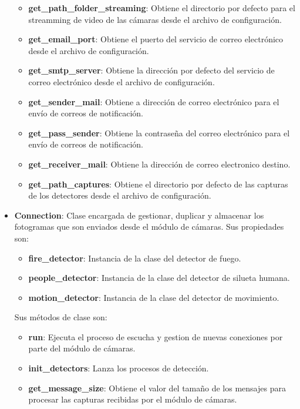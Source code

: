 \begin{itemize}
\begin{itemize}
            \item \textbf{get\_path\_folder\_streaming}: Obtiene el directorio por defecto para el streamming de video de las cámaras desde el archivo de configuración.
            \item \textbf{get\_email\_port}: Obtiene el puerto del servicio de correo electrónico desde el archivo de configuración.
            \item \textbf{get\_smtp\_server}: Obtiene la dirección por defecto del servicio de correo electrónico desde el archivo de configuración.
            \item \textbf{get\_sender\_mail}: Obtiene a dirección de correo electrónico para el envío de correos de notificación. 
            \item \textbf{get\_pass\_sender}: Obtiene la contraseña del correo electrónico para el envío de correos de notificación. 
            \item \textbf{get\_receiver\_mail}: Obtiene la dirección de correo electronico destino.
            \item \textbf{get\_path\_captures}: Obtiene el directorio por defecto de las capturas de los detectores desde el archivo de configuración.
        \end{itemize}
    \item \textbf{Connection}: Clase encargada de gestionar, duplicar y almacenar los fotogramas que son enviados desde el módulo de cámaras. Sus propiedades son:
        \begin{itemize}
            \item \textbf{fire\_detector}: Instancia de la clase del detector de fuego.
            \item \textbf{people\_detector}: Instancia de la clase del detector de silueta humana.
            \item \textbf{motion\_detector}: Instancia de la clase del detector de movimiento.
        \end{itemize}
        Sus métodos de clase son:
        \begin{itemize}
            \item \textbf{run}: Ejecuta el proceso de escucha y gestion de nuevas conexiones por parte del módulo de cámaras.
            \item \textbf{init\_detectors}: Lanza los procesos de detección.
            \item \textbf{get\_message\_size}: Obtiene el valor del tamaño de los mensajes para procesar las capturas recibidas por el módulo de cámaras.

\end{itemize}
\end{itemize}

